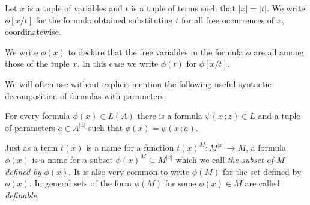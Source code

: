 Let $x$ is a tuple of variables and $t$ is a tuple of terms such that $|x|=|t|$. We write $\phi[x/t]$ for the formula obtained substituting $t$ for all free occurrences of $x$, coordinatewise.  

We write $\phi(x)$ to declare that the free variables in the formula $\phi$ are all among those of the tuple $x$. In this case we write $\phi(t)$ for $\phi[x/t]$.

We will often use without explicit mention the following useful syntactic decomposition of formulas with parameters.


\begin{lemma}\label{rappresentazione formule con parametri}
For every formula $\phi(x)\in L(A)$ there is a formula $\psi(x\,;z)\in L$ and a tuple of parameters $a\in A^{|z|}$ such that $\phi(x)=\psi(x\,;a)$.\QED
\end{lemma}

Just as a term $t(x)$ is a name for a function $t(x)^M:M^{|x|}\to M$, a formula $\phi(x)$ is a name for a subset \emph{$\phi(x)^M$\/}$\subseteq M^{|x|}$ which we call \emph{the subset of $M$ defined by $\phi(x)$}. It is also very common to write \emph{$\phi(M)$} for the set defined by $\phi(x)$. In general sets of the form $\phi(M)$ for some $\phi(x)\in M$ are called \emph{definable}.


